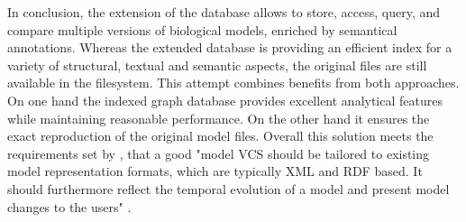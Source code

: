 In conclusion, the extension of the \masymos database allows to store, access, query, and compare multiple versions of biological models, enriched by semantical annotations. Whereas the extended \masymos database is providing an efficient index for a variety of structural, textual and semantic aspects, the original files are still available in the filesystem.
This attempt combines benefits from both approaches.
On one hand the indexed graph database provides excellent analytical features while maintaining reasonable performance. On the other hand it ensures the exact reproduction of the original model files.
Overall this solution meets the requirements set by \citet{Waltemath2013}, that a good "model VCS should be tailored to existing model  representation formats, which are typically XML and RDF based. It should furthermore reflect the temporal evolution of a model and present model changes to the users" \citep{Waltemath2013}.

 

